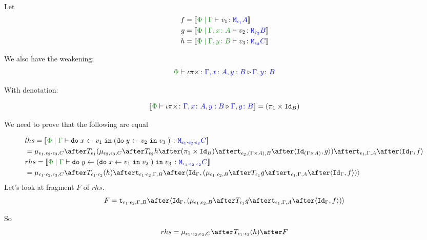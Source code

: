 {
Let
\begin{align}
    f ={}& \deno{\gpetyperelation{v_1}{\M{\e_1}{A}}}\\
    g ={}& \deno{\etyperelation{\P}{\gax}{v_2}{\M{\e_2}{B}}}\\
    h ={}& \deno{\etyperelation{\P}{\gby}{v_3}{\M{\e_3}{C}}}\\
\end{align}

We also have the weakening:
\begin{equation}
    \ewrel{\P}{\i\pi\times}{\gax, y: B}{\gby}
\end{equation}

With denotation:

\begin{equation}
    \deno{\ewrel{\P}{\i\pi\times}{\gax, y: B}{\gby}} = (\p \times \Id{B})
\end{equation}

We need to prove that the following are equal

\begin{align}
    &lhs =  \deno{\gpetyperelation{\doin{x}{v_1}{(\doin{y}{v_2}{v_3})}}{\M{\e_1\dot\e_2\dot\e_2}{C}}} \\
    & = \bind{\e_1}{\e_2\dot\e_3}{C}\after\T{
        \e_1}{(\bind{\e_2}{\e_3}{C}\after\T{\e_2}{h\after(\p \times \Id{B})}\after\tstrength{\e_2}{(\G\times A)}{B}\after\pr{\Id{(\G\times A)}}{g}
        )}\after\tstrength{\e_1}{\G}{A}\after\pr{\idg}{f}\\
    & rhs = \deno{\gpetyperelation{\doin{y}{(\doin{x}{v_1}{v_2})}{v_3}}{\M{\e_1\dot\e_2\dot\e_2}{C}}}  \\
    & = \bind{\e_1\dot\e_2}{\e_3}{C}\after\T{\e_1\dot\e_2}{(h)}\after\tstrength{\e_1\dot\e_2}{\G}{B}\after\pr{\idg}{(\bind{\e_1}{\e_2}{B}\after\T{\e_1}{g}\after\tstrength{\e_1}{\G}{A}\after\pr{\idg}{f})} \\
\end{align}
Let's look at fragment $F$ of $rhs$.
\begin{equation}
    F = \tstrength{\e_1\dot\e_2}{\G}{B}\after\pr{\idg}{(\bind{\e_1}{\e_2}{B}\after\T{\e_1}{g}\after\tstrength{\e_1}{\G}{A}\after\pr{\idg}{f})}
\end{equation}

So 
\begin{equation}
    rhs = \bind{\e_1\dot\e_2}{\e_3}{C}\after\T{\e_1\dot\e_2}{(h)}\after F
\end{equation}

}
